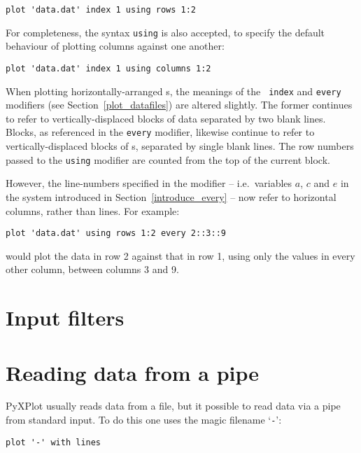\begin{verbatim}
plot 'data.dat' index 1 using rows 1:2
\end{verbatim}

\noindent For completeness, the syntax {\tt using}  is also
accepted, to specify the default behaviour of plotting columns against one
another:

\begin{verbatim}
plot 'data.dat' index 1 using columns 1:2
\end{verbatim}

When plotting horizontally-arranged \datafile s, the meanings of the {\tt
index} and {\tt every} modifiers (see Section~\ref{plot_datafiles}) are altered
slightly. The former continues to refer to vertically-displaced blocks of data
separated by two blank lines.  Blocks, as referenced in the {\tt every}
modifier, likewise continue to refer to vertically-displaced blocks of
\datapoint s, separated by single blank lines. The row numbers passed to the
{\tt using} modifier are counted from the top of the current block.

However, the line-numbers specified in the  modifier -- i.e.\
variables $a$, $c$ and $e$ in the system introduced in
Section~\ref{introduce_every} -- now refer to horizontal columns, rather than
lines. For example:

\begin{verbatim}
plot 'data.dat' using rows 1:2 every 2::3::9
\end{verbatim}

\noindent would plot the data in row 2 against that in row 1, using only the
values in every other column, between columns 3 and 9.

\section{Input filters}

\section{Reading data from a pipe}

PyXPlot usually reads data from a file, but it possible to read data via a pipe
from standard input.  To do this one uses the magic filename `{\tt -}':

\begin{verbatim}
plot '-' with lines
\end{verbatim}

